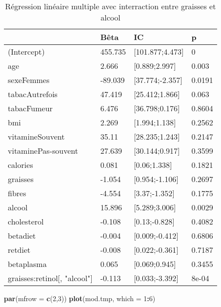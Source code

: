 \documentclass[]{article}
\newenvironment{Shaded}{\begin{snugshade}}{\end{snugshade}}
\newcommand{\KeywordTok}[1]{\textcolor[rgb]{0.13,0.29,0.53}{\textbf{#1}}}
\newcommand{\DataTypeTok}[1]{\textcolor[rgb]{0.13,0.29,0.53}{#1}}
\newcommand{\DecValTok}[1]{\textcolor[rgb]{0.00,0.00,0.81}{#1}}
\newcommand{\OperatorTok}[1]{\textcolor[rgb]{0.81,0.36,0.00}{\textbf{#1}}}
\newcommand{\NormalTok}[1]{#1}
\begin{document}
\begin{table}

\caption{\label{tab:unnamed-chunk-75}Régression linéaire multiple avec interraction entre graisses et alcool}
\centering
\begin{tabular}[t]{l|l|l|l}
\hline
  & Bêta & IC & p\\
\hline
\rowcolor[HTML]{BBD2E1}  (Intercept) & 455.735 & [101.877;4.473] & 0\\
\hline
age & 2.666 & [0.889;2.997] & 0.003\\
\hline
\rowcolor[HTML]{BBD2E1}  sexeFemmes & -89.039 & [37.774;-2.357] & 0.0191\\
\hline
tabacAutrefois & 47.419 & [25.412;1.866] & 0.063\\
\hline
\rowcolor[HTML]{BBD2E1}  tabacFumeur & 6.476 & [36.798;0.176] & 0.8604\\
\hline
bmi & 2.269 & [1.994;1.138] & 0.2562\\
\hline
\rowcolor[HTML]{BBD2E1}  vitamineSouvent & 35.11 & [28.235;1.243] & 0.2147\\
\hline
vitaminePas-souvent & 27.639 & [30.144;0.917] & 0.3599\\
\hline
\rowcolor[HTML]{BBD2E1}  calories & 0.081 & [0.06;1.338] & 0.1821\\
\hline
graisses & -1.054 & [0.954;-1.106] & 0.2697\\
\hline
\rowcolor[HTML]{BBD2E1}  fibres & -4.554 & [3.37;-1.352] & 0.1775\\
\hline
alcool & 15.896 & [5.289;3.006] & 0.0029\\
\hline
\rowcolor[HTML]{BBD2E1}  cholesterol & -0.108 & [0.13;-0.828] & 0.4082\\
\hline
betadiet & -0.004 & [0.009;-0.412] & 0.6806\\
\hline
\rowcolor[HTML]{BBD2E1}  retdiet & -0.008 & [0.022;-0.361] & 0.7187\\
\hline
betaplasma & 0.065 & [0.069;0.945] & 0.3455\\
\hline
\rowcolor[HTML]{BBD2E1}  graisses:retinol[, "alcool"] & -0.113 & [0.033;-3.392] & 8e-04\\
\hline
\end{tabular}
\end{table}

\begin{Shaded}
\begin{Highlighting}[]
\KeywordTok{par}\NormalTok{(}\DataTypeTok{mfrow =} \KeywordTok{c}\NormalTok{(}\DecValTok{2}\NormalTok{,}\DecValTok{3}\NormalTok{))}
\KeywordTok{plot}\NormalTok{(mod.tmp, }\DataTypeTok{which =} \DecValTok{1}\OperatorTok{:}\DecValTok{6}\NormalTok{)}
\end{Highlighting}
\end{Shaded}
\end{document}
